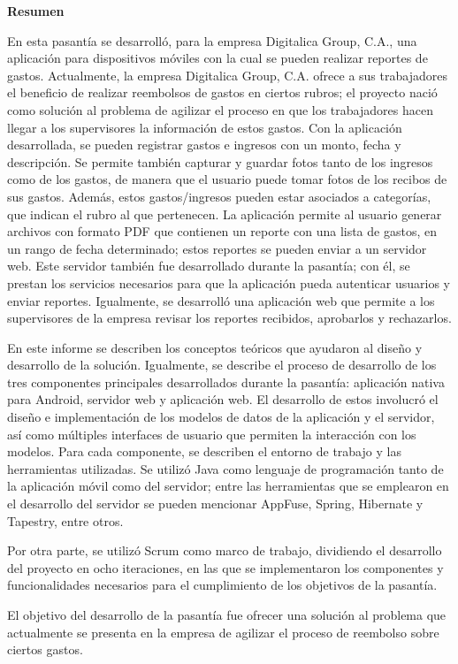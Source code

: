 \setcounter{page}{3}
\begin{center}
	{\bf Resumen}  %
\end{center}	

En esta pasantía se desarrolló, para la empresa Digitalica Group, C.A., una aplicación para dispositivos móviles con la cual se pueden realizar reportes de gastos. Actualmente, la empresa Digitalica Group, C.A. ofrece a sus trabajadores el beneficio de realizar reembolsos de gastos en ciertos rubros; el proyecto nació como solución al problema de agilizar el proceso en que los trabajadores hacen llegar a los supervisores la información de estos gastos. Con la aplicación desarrollada, se pueden registrar gastos e ingresos con un monto, fecha y descripción. Se permite también capturar y guardar fotos tanto de los ingresos como de los gastos, de manera que el usuario puede tomar fotos de los recibos de sus gastos. Además, estos gastos/ingresos pueden estar asociados a categorías, que indican el rubro al que pertenecen. La aplicación permite al usuario generar archivos con formato PDF que contienen un reporte con una lista de gastos, en un rango de fecha determinado; estos reportes se pueden enviar a un servidor web. Este servidor también fue desarrollado durante la pasantía; con él, se prestan los servicios necesarios para que la aplicación pueda autenticar usuarios y enviar reportes. Igualmente, se desarrolló una aplicación web que permite a los supervisores de la empresa revisar los reportes recibidos, aprobarlos y rechazarlos.

En este informe se describen los conceptos teóricos que ayudaron al diseño y desarrollo de la solución. Igualmente, se describe el proceso de desarrollo de los tres componentes principales desarrollados durante la pasantía: aplicación nativa para Android, servidor web y aplicación web. El desarrollo de estos involucró el diseño e implementación de los modelos de datos de la aplicación y el servidor, así como múltiples interfaces de usuario que permiten la interacción con los modelos. Para cada componente, se describen el entorno de trabajo y las herramientas utilizadas. Se utilizó Java como lenguaje de programación tanto de la aplicación móvil como del servidor; entre las herramientas que se emplearon en el desarrollo del servidor se pueden mencionar AppFuse, Spring, Hibernate y Tapestry, entre otros.

Por otra parte, se utilizó Scrum como marco de trabajo, dividiendo el desarrollo del proyecto en ocho iteraciones, en las que se implementaron los componentes y funcionalidades necesarios para el cumplimiento de los objetivos de la pasantía.

El objetivo del desarrollo de la pasantía fue ofrecer una solución al problema que actualmente se presenta en la empresa de agilizar el proceso de reembolso sobre ciertos gastos.


